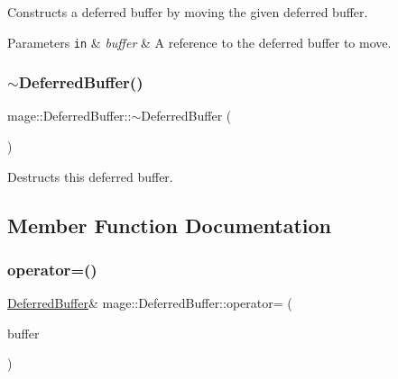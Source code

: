 Constructs a deferred buffer by moving the given deferred buffer.


\begin{DoxyParams}[1]{Parameters}
\mbox{\tt in}  & {\em buffer} & A reference to the deferred buffer to move. \\
\hline
\end{DoxyParams}
\hypertarget{structmage_1_1_deferred_buffer_ab5ffca775b2dc3191957fcecac894157}{}\label{structmage_1_1_deferred_buffer_ab5ffca775b2dc3191957fcecac894157} 
\subsubsection{\texorpdfstring{$\sim$\+Deferred\+Buffer()}{~DeferredBuffer()}}
{\footnotesize\ttfamily mage\+::\+Deferred\+Buffer\+::$\sim$\+Deferred\+Buffer (\begin{DoxyParamCaption}{ }\end{DoxyParamCaption})\hspace{0.3cm}{\ttfamily [default]}}

Destructs this deferred buffer. 

\subsection{Member Function Documentation}
\hypertarget{structmage_1_1_deferred_buffer_ac607233d2d165aefd48d0769ebb67999}{}\label{structmage_1_1_deferred_buffer_ac607233d2d165aefd48d0769ebb67999} 
\subsubsection{\texorpdfstring{operator=()}{operator=()}\hspace{0.1cm}{\footnotesize\ttfamily [1/2]}}
{\footnotesize\ttfamily \hyperlink{structmage_1_1_deferred_buffer}{Deferred\+Buffer}\& mage\+::\+Deferred\+Buffer\+::operator= (\begin{DoxyParamCaption}\item[{const \hyperlink{structmage_1_1_deferred_buffer}{Deferred\+Buffer} \&}]{buffer }\end{DoxyParamCaption})\hspace{0.3cm}{\ttfamily [default]}}

